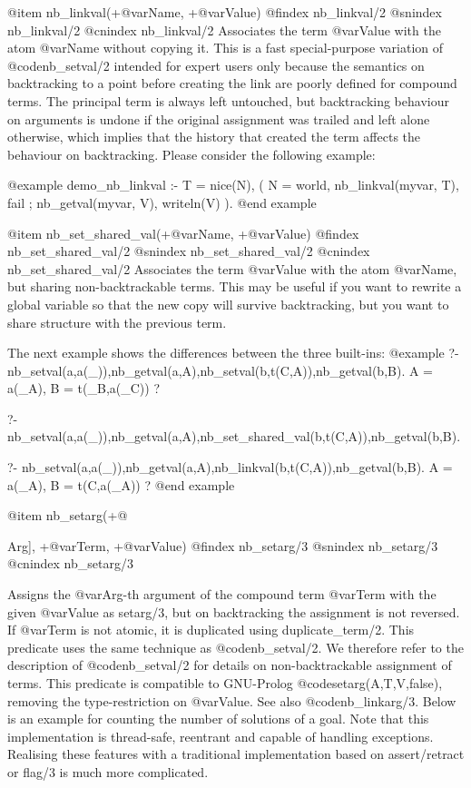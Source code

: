 {{{{{{@item nb_linkval(+@var{Name}, +@var{Value}) 
@findex nb_linkval/2
@snindex nb_linkval/2
@cnindex nb_linkval/2
Associates the term @var{Value} with the atom @var{Name} without
copying it. This is a fast special-purpose variation of @code{nb_setval/2}
intended for expert users only because the semantics on backtracking
to a point before creating the link are poorly defined for compound
terms. The principal term is always left untouched, but backtracking
behaviour on arguments is undone if the original assignment was
trailed and left alone otherwise, which implies that the history that
created the term affects the behaviour on backtracking. Please
consider the following example:

@example
demo_nb_linkval :-
        T = nice(N),
        (   N = world,
            nb_linkval(myvar, T),
            fail
        ;   nb_getval(myvar, V),
            writeln(V)
        ).
@end example

@item nb_set_shared_val(+@var{Name}, +@var{Value}) 
@findex nb_set_shared_val/2
@snindex nb_set_shared_val/2
@cnindex nb_set_shared_val/2
Associates the term @var{Value} with the atom @var{Name}, but sharing
non-backtrackable terms. This may be useful if you want to rewrite a
global variable so that the new copy will survive backtracking, but
you want to share structure with the previous term.

The next example shows the differences between the three built-ins:
@example
?- nb_setval(a,a(_)),nb_getval(a,A),nb_setval(b,t(C,A)),nb_getval(b,B).
A = a(_A),
B = t(_B,a(_C)) ? 

?- nb_setval(a,a(_)),nb_getval(a,A),nb_set_shared_val(b,t(C,A)),nb_getval(b,B).

?- nb_setval(a,a(_)),nb_getval(a,A),nb_linkval(b,t(C,A)),nb_getval(b,B).
A = a(_A),
B = t(C,a(_A)) ?
@end example

@item nb_setarg(+@{Arg], +@var{Term}, +@var{Value})
@findex nb_setarg/3
@snindex nb_setarg/3
@cnindex nb_setarg/3

Assigns the @var{Arg}-th argument of the compound term @var{Term} with
the given @var{Value} as setarg/3, but on backtracking the assignment
is not reversed. If @var{Term} is not atomic, it is duplicated using
duplicate_term/2. This predicate uses the same technique as
@code{nb_setval/2}. We therefore refer to the description of
@code{nb_setval/2} for details on non-backtrackable assignment of
terms. This predicate is compatible to GNU-Prolog
@code{setarg(A,T,V,false)}, removing the type-restriction on
@var{Value}. See also @code{nb_linkarg/3}. Below is an example for
counting the number of solutions of a goal. Note that this
implementation is thread-safe, reentrant and capable of handling
exceptions. Realising these features with a traditional implementation
based on assert/retract or flag/3 is much more complicated.

}}}}}}}
